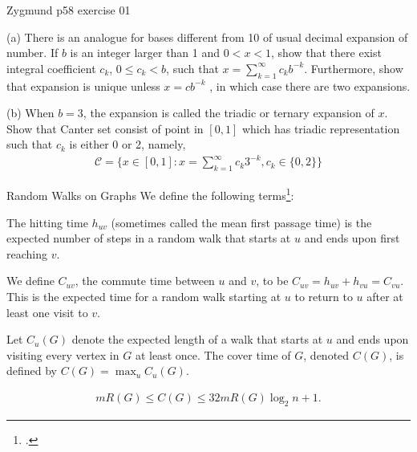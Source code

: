 \documentclass[UTF8,a4paper,10pt]{article}
\begin{document}

  \begin{Problem}[]{Zygmund p58 exercise 01}

    (a) There is an analogue for bases different from 10 of usual decimal expansion of number. If $b$ is an integer larger than 1 and $0 < x < 1$,
    show that there exist integral coefficient $c_k$, $0 \leq c_k < b$, such that $x = \sum_{k=1}^{\infty}c_k b^{-k}$. Furthermore, show that expansion is unique unless
    $x = cb^{-k}$
    , in which case there are two expansions.  


    (b) When $b = 3$, the expansion is called the triadic or ternary
    expansion of $x$. Show that Canter set consist of point in $[0,1]$ which has triadic representation such that $c_k$ is either 0 or 2, namely,
    \begin{equation*}
      \begin{aligned}
        \mathcal{C}  = \{x \in [0, 1] : x =\sum_{k=1}^{\infty}c_k 3^{-k}
, c_k \in \{0, 2\}\}
      \end{aligned}
    \end{equation*}
  \end{Problem}

  \begin{mybox}{Random Walks on Graphs}
    We define the following terms\footcite[][133]{motwani95}:
\begin{definition}
  The hitting time \(h_{uv}\) (sometimes called the mean first passage time) is the expected number of steps in a random walk that starts at \(u\) and ends upon first reaching \(v\).
\end{definition}
\begin{definition}
  We define \(C_{uv}\), the commute time between \(u\) and \(v\), to be \(C_{uv} = h_{uv}+h_{vu} = C_{vu}\). This is the expected time for a random walk starting at \(u\) to return to \(u\) after at least one visit to \(v\).
\end{definition}
\begin{definition}
  Let \(C_u(G)\) denote the expected length of a walk that starts at \(u\) and ends upon visiting every vertex in \(G\) at least once. The cover time of \(G\), denoted \(C(G)\), is defined by \(C(G) = \max_u C_u(G)\).
\end{definition}
  \end{mybox}


  \begin{solution}

    \begin{equation*}
      \begin{aligned}
        mR(G) \leq C(G) \leq 32mR(G) \log_2 n + 1.
      \end{aligned}
    \end{equation*}
 

  \end{solution}
\end{document}
